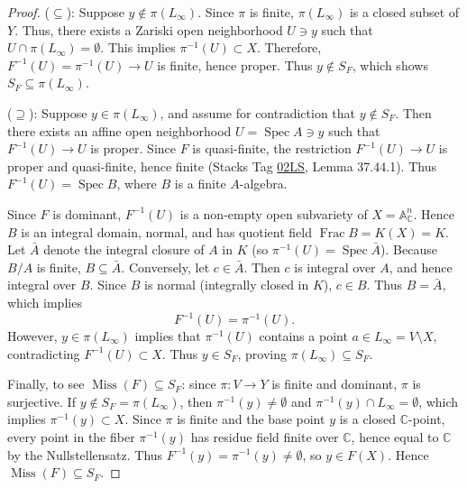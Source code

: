\documentclass[11pt,reqno]{amsart}
\theoremstyle{plain}
\theoremstyle{definition}
\numberwithin{equation}{section}
\DeclareMathOperator{\Spec}{Spec}
\DeclareMathOperator{\Miss}{Miss}
\DeclareMathOperator{\Frac}{Frac}
\newcommand{\A}{\mathbb{A}}
\newcommand{\C}{\mathbb{C}}
\begin{document}
\begin{proof}
($\subseteq$): Suppose $y \notin \pi(L_\infty)$. Since $\pi$ is finite, $\pi(L_\infty)$ is a closed subset of $Y$. Thus, there exists a Zariski open neighborhood $U \ni y$ such that $U \cap \pi(L_\infty) = \emptyset$. This implies $\pi^{-1}(U) \subset X$. Therefore, $F^{-1}(U) = \pi^{-1}(U) \to U$ is finite, hence proper. Thus $y \notin S_F$, which shows $S_F \subseteq \pi(L_\infty)$.

($\supseteq$): Suppose $y \in \pi(L_\infty)$, and assume for contradiction that $y \notin S_F$. Then there exists an affine open neighborhood $U = \Spec A \ni y$ such that $F^{-1}(U) \to U$ is proper. Since $F$ is quasi-finite, the restriction $F^{-1}(U) \to U$ is proper and quasi-finite, hence finite (Stacks Tag \href{https://stacks.math.columbia.edu/tag/02LS}{02LS}, Lemma 37.44.1). Thus $F^{-1}(U) = \Spec B$, where $B$ is a finite $A$-algebra.

Since $F$ is dominant, $F^{-1}(U)$ is a non-empty open subvariety of $X = \A^n_\C$. Hence $B$ is an integral domain, normal, and has quotient field $\Frac B = K(X) = K$. Let $\bar{A}$ denote the integral closure of $A$ in $K$ (so $\pi^{-1}(U) = \Spec \bar{A}$). Because $B/A$ is finite, $B \subseteq \bar{A}$. Conversely, let $c \in \bar{A}$. Then $c$ is integral over $A$, and hence integral over $B$. Since $B$ is normal (integrally closed in $K$), $c \in B$. Thus $B = \bar{A}$, which implies
\[
F^{-1}(U) = \pi^{-1}(U).
\]
However, $y \in \pi(L_\infty)$ implies that $\pi^{-1}(U)$ contains a point $a \in L_\infty = V \setminus X$, contradicting $F^{-1}(U) \subset X$. Thus $y \in S_F$, proving $\pi(L_\infty) \subseteq S_F$.

Finally, to see $\Miss(F) \subseteq S_F$: since $\pi: V \to Y$ is finite and dominant, $\pi$ is surjective. If $y \notin S_F = \pi(L_\infty)$, then $\pi^{-1}(y) \neq \emptyset$ and $\pi^{-1}(y) \cap L_\infty = \emptyset$, which implies $\pi^{-1}(y) \subset X$. Since $\pi$ is finite and the base point $y$ is a closed $\C$-point, every point in the fiber $\pi^{-1}(y)$ has residue field finite over $\C$, hence equal to $\C$ by the Nullstellensatz. Thus $F^{-1}(y) = \pi^{-1}(y) \neq \emptyset$, so $y \in F(X)$. Hence $\Miss(F) \subseteq S_F$.
\end{proof}
\end{document}

